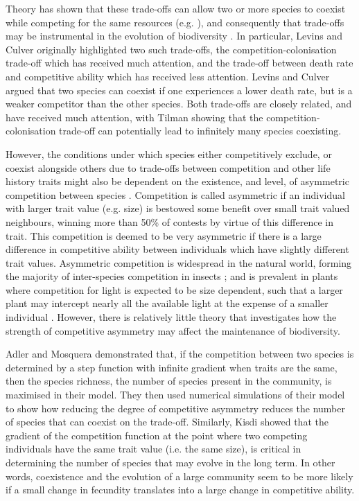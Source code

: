 Theory has shown that these trade-offs can allow two or more species to coexist while competing for the same resources  (e.g. \cite{kisdi2003coexistence, levins1971regional, bonsall2004life} ), and consequently that trade-offs may be instrumental in the evolution of biodiversity \cite{schluter1995adaptive, white2005adaptive, bonsall2004life}. In particular, Levins and Culver \cite{levins1971regional} originally highlighted two such trade-offs, the competition-colonisation trade-off which has received much attention, and the trade-off between death rate and competitive ability which has received less attention. Levins and Culver argued that two species can coexist if one experiences a lower death rate, but is a weaker competitor than the other species. Both trade-offs are closely related, and have received much attention, with Tilman \cite{tilman1994competition} showing that the competition-colonisation trade-off can potentially lead to infinitely many species coexisting.

However, the conditions under which species either competitively exclude, or coexist alongside others due to trade-offs between competition and other life history traits might also be dependent on the existence, and level, of asymmetric competition between species \cite{adler2000space}. Competition is called asymmetric if an individual with larger trait value (e.g. size) is bestowed some benefit over small trait valued neighbours, winning more than 50\% of contests by virtue of this difference in trait. This competition is deemed to be very asymmetric if there is a large difference in competitive ability between individuals which have slightly different trait values. Asymmetric competition is widespread in the natural world, forming the majority of inter-species competition in insects \cite{lawton1981asymmetrical}; and is prevalent in plants where competition for light is expected to be size dependent, such that a larger plant may intercept nearly all the available light at the expense of a smaller individual \cite{weiner1990asymmetric}. However, there is relatively little theory that investigates how the strength of competitive asymmetry may affect the maintenance of biodiversity.

Adler and Mosquera \cite{adler2000space} demonstrated that, if the competition between two species is determined by a step function with infinite gradient when traits are the same, then the species richness, the number of species present in the community, is maximised in their model. They then used numerical simulations of their model to show how reducing the degree of competitive asymmetry reduces the number of species that can coexist on the trade-off. Similarly, Kisdi  \cite{kisdi1999evolutionary} showed that the gradient of the competition function at the point where two competing individuals have the same trait value (i.e. the same size), is critical in determining the number of species that may evolve in the long term. In other words, coexistence and the evolution of a large community seem to be more likely if a small change in fecundity translates into a large change in competitive ability.

